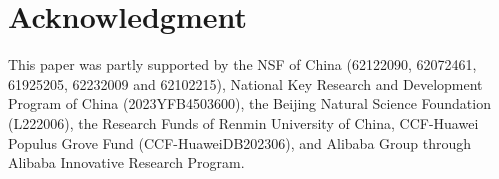\section*{Acknowledgment}\label{sec:ack}






This paper was partly supported by the NSF of China (62122090, 62072461, 61925205, 62232009 and 62102215), National Key Research and Development Program of China (2023YFB4503600), the Beijing Natural Science Foundation (L222006), the Research Funds of Renmin University of China, CCF-Huawei Populus Grove Fund (CCF-HuaweiDB202306), and Alibaba Group through Alibaba Innovative Research Program.
